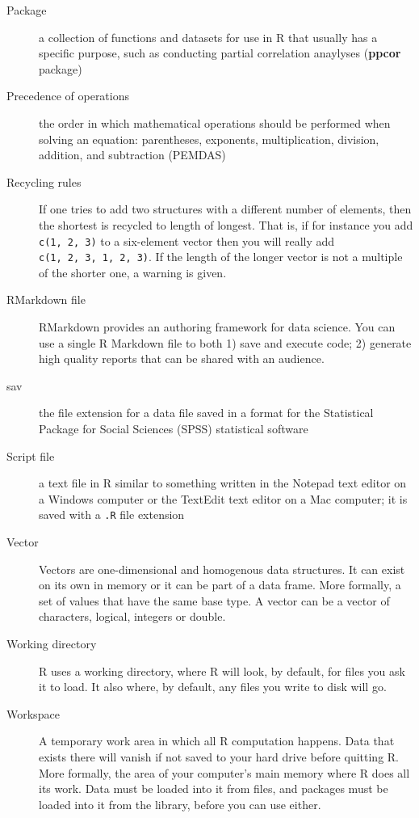 \documentclass[
]{book}
\begin{document}
\begin{description}
\item[Package]
a collection of functions and datasets for use in R that usually has a specific purpose, such as conducting partial correlation anaylyses (\textbf{ppcor} package)
\item[Precedence of operations]
the order in which mathematical operations should be performed when solving an equation: parentheses, exponents, multiplication, division, addition, and subtraction (PEMDAS)
\item[Recycling rules]
If one tries to add two structures with a different number of elements, then the shortest is recycled to length of longest. That is, if for instance you add \texttt{c(1,\ 2,\ 3)} to a six-element vector then you will really add \texttt{c(1,\ 2,\ 3,\ 1,\ 2,\ 3)}. If the length of the longer vector is not a multiple of the shorter one, a warning is given.
\item[RMarkdown file]
RMarkdown provides an authoring framework for data science. You can use a single R Markdown file to both 1) save and execute code; 2) generate high quality reports that can be shared with an audience.
\item[sav]
the file extension for a data file saved in a format for the Statistical Package for Social Sciences (SPSS) statistical software
\item[Script file]
a text file in R similar to something written in the Notepad text editor on a Windows computer or the TextEdit text editor on a Mac computer; it is saved with a \texttt{.R} file extension
\item[Vector]
Vectors are one-dimensional and homogenous data structures. It can exist on its own in memory or it can be part of a data frame. More formally, a set of values that have the same base type. A vector can be a vector of characters, logical, integers or double.
\item[Working directory]
R uses a working directory, where R will look, by default, for files you ask it to load. It also where, by default, any files you write to disk will go.
\item[Workspace]
A temporary work area in which all R computation happens. Data that exists there will vanish if not saved to your hard drive before quitting R. More formally, the area of your computer's main memory where R does all its work. Data must be loaded into it from files, and packages must be loaded into it from the library, before you can use either.
\end{description}
\end{document}
